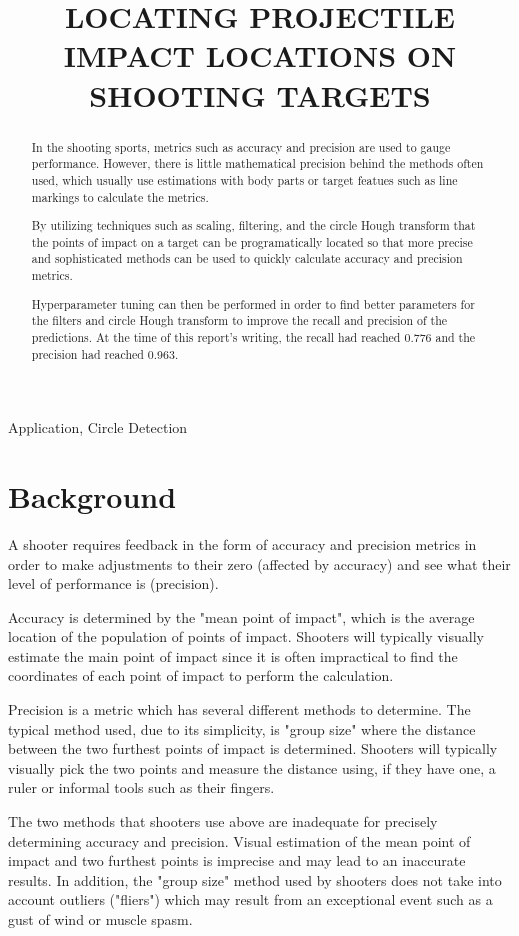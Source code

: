 \documentclass{article}
\title{LOCATING PROJECTILE IMPACT LOCATIONS ON SHOOTING TARGETS}
\begin{document}
%
\maketitle
%
\begin{abstract}
In the shooting sports, metrics such as accuracy and precision are used to gauge performance.
However, there is little mathematical precision behind the methods often used, which usually
use estimations with body parts or target featues such as line markings to calculate
the metrics.

By utilizing techniques such as scaling, filtering, and the
circle Hough transform that the points of impact on a target can be programatically located so that
more precise and sophisticated methods can be used to quickly calculate accuracy and precision metrics.

Hyperparameter tuning can then be performed in order to find better parameters for the
filters and circle Hough transform to improve the recall and precision of the predictions.
At the time of this report's writing, the recall had reached 0.776 and the precision had
reached 0.963.
\end{abstract}
%
\begin{keywords}
Application, Circle Detection
\end{keywords}
%
\section{Background}
\label{sec:background}
A shooter requires feedback in the form of accuracy and precision metrics in order
to make adjustments to their zero (affected by accuracy) and see what their level
of performance is (precision).

Accuracy is determined by the "mean point of impact", which is the average location
of the population of points of impact. Shooters will typically visually estimate
the main point of impact since it is often impractical to find the coordinates
of each point of impact to perform the calculation.

Precision is a metric which has several different methods to determine.
The typical method used, due to its simplicity, is "group size" where the distance
between the two furthest points of impact is determined. Shooters will typically visually
pick the two points and measure the distance using, if they have one, a ruler or
informal tools such as their fingers.

The two methods that shooters use above are inadequate for precisely determining
accuracy and precision. Visual estimation of the mean point of impact and two 
furthest points is imprecise and may lead to an inaccurate results. In addition,
the "group size" method used by shooters does not take into account outliers ("fliers")
which may result from an exceptional event such as a gust of wind or muscle spasm.
\end{document}
